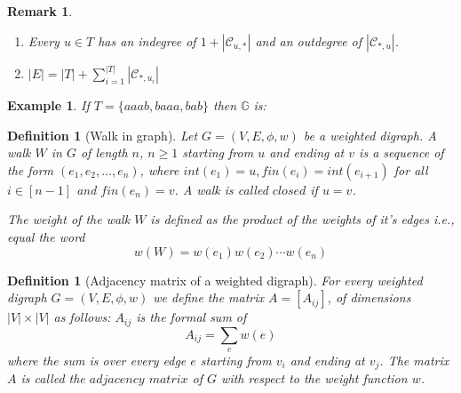 \documentclass[12pt]{report}
\newtheorem*{remark}{Remark}
\newtheorem{defn}[mythm]{Definition}
\newtheorem{exa}[mythm]{Example}
\begin{document}
{\begin{remark}
\begin{enumerate}[label=\roman{*})]
\item Every $u \in T$ has an indegree of $1+|\mathcal{C}_{u,*}|$ and an outdegree of $|\mathcal{C}_{*,u}|$.

\item $|E|=|T|+\sum\limits_{i=1}^{|T|} |\mathcal{C}_{*,u_i}|$

\end{enumerate}
\end{remark}

\begin{exa} If $T=\{aaab,baaa,bab\}$ then $\mathbb{G}$ is:
\end{exa}
\begin{figure}\centering
{}
\end{figure}

\begin{defn}[Walk in graph]
Let $G=(V,E,\phi,w)$ be a weighted digraph. A {\em walk} $W$ in $G$ of length $n$, $n \geq 1$ starting from $u$ and ending at $v$ is a sequence of the form $(e_1,e_2,\ldots,e_n)$, where $int(e_1)=u, fin(e_i) = int(e_{i+1})$ for all $i \in [n-1]$ and $fin(e_n)=v$. A walk is called $closed$ if $u=v$.

The weight of the walk $W$ is defined as the product of the weights of it's edges i.e., equal the word
\[w(W)=w(e_1) w(e_2) \cdots w(e_n)\]
\end{defn}


\begin{defn}[Adjacency matrix of a weighted digraph]
For every weighted digraph $G = (V, E, \phi, w)$ we define the matrix $A = [A_{ij}]$, of dimensions $|V| \times |V|$ as follows: $A_{ij}$ is the formal sum of 
\[A_{ij}=\sum_e w(e)\] 
where the sum is over every edge $e$ starting from $v_i$ and ending at $v_j$. The matrix $A$ is called the $adjacency$ $matrix$ of $G$ with respect to the weight function $w$.
\end{defn}

}
\end{document}
